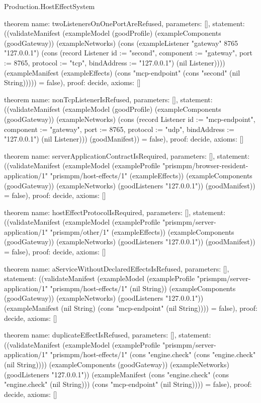 \begin{lexlean}{Production.HostEffectSystem}
\begin{semanticmodule}
theorem{
  name: twoListenersOnOnePortAreRefused,
  parameters: [],
  statement: ((validateManifest (exampleModel (goodProfile) (exampleComponents (goodGateway)) (exampleNetworks) (cons (exampleListener "gateway" 8765 "127.0.0.1") (cons (record Listener {id := "second", component := "gateway", port := 8765, protocol := "tcp", bindAddress := "127.0.0.1"}) (nil Listener)))) (exampleManifest (exampleEffects) (cons "mcp-endpoint" (cons "second" (nil String))))) = false),
  proof: decide{},
  axioms: []
}

theorem{
  name: nonTcpListenerIsRefused,
  parameters: [],
  statement: ((validateManifest (exampleModel (goodProfile) (exampleComponents (goodGateway)) (exampleNetworks) (cons (record Listener {id := "mcp-endpoint", component := "gateway", port := 8765, protocol := "udp", bindAddress := "127.0.0.1"}) (nil Listener))) (goodManifest)) = false),
  proof: decide{},
  axioms: []
}

theorem{
  name: serverApplicationContractIsRequired,
  parameters: [],
  statement: ((validateManifest (exampleModel (exampleProfile "prismpm/browser-resident-application/1" "prismpm/host-effects/1" (exampleEffects)) (exampleComponents (goodGateway)) (exampleNetworks) (goodListeners "127.0.0.1")) (goodManifest)) = false),
  proof: decide{},
  axioms: []
}

theorem{
  name: hostEffectProtocolIsRequired,
  parameters: [],
  statement: ((validateManifest (exampleModel (exampleProfile "prismpm/server-application/1" "prismpm/other/1" (exampleEffects)) (exampleComponents (goodGateway)) (exampleNetworks) (goodListeners "127.0.0.1")) (goodManifest)) = false),
  proof: decide{},
  axioms: []
}

theorem{
  name: aServiceWithoutDeclaredEffectsIsRefused,
  parameters: [],
  statement: ((validateManifest (exampleModel (exampleProfile "prismpm/server-application/1" "prismpm/host-effects/1" (nil String)) (exampleComponents (goodGateway)) (exampleNetworks) (goodListeners "127.0.0.1")) (exampleManifest (nil String) (cons "mcp-endpoint" (nil String)))) = false),
  proof: decide{},
  axioms: []
}

theorem{
  name: duplicateEffectIsRefused,
  parameters: [],
  statement: ((validateManifest (exampleModel (exampleProfile "prismpm/server-application/1" "prismpm/host-effects/1" (cons "engine.check" (cons "engine.check" (nil String)))) (exampleComponents (goodGateway)) (exampleNetworks) (goodListeners "127.0.0.1")) (exampleManifest (cons "engine.check" (cons "engine.check" (nil String))) (cons "mcp-endpoint" (nil String)))) = false),
  proof: decide{},
  axioms: []
}


\end{semanticmodule}
\end{lexlean}
